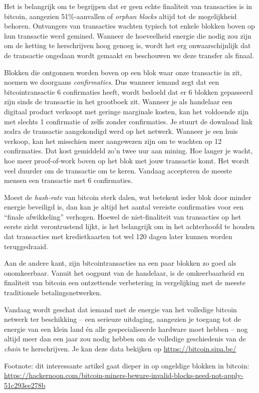 Het is belangrijk om te begrijpen dat er geen echte finaliteit van transacties is in bitcoin, aangezien 51\%-aanvallen of \textit{orphan blocks} altijd tot de mogelijkheid behoren. Ontvangers van transacties wachten typisch tot enkele blokken boven op hun transactie werd gemined. Wanneer de hoeveelheid energie die nodig zou zijn om de ketting te herschrijven hoog genoeg is, wordt het erg onwaarschijnlijk dat de transactie ongedaan wordt gemaakt en beschouwen we deze transfer als finaal.

Blokken die ontgonnen worden boven op een blok waar onze transactie in zit, noemen we doorgaans \textit{confirmaties}. Dus wanneer iemand zegt dat een bitcointransactie 6 confirmaties heeft, wordt bedoeld dat er 6 blokken gepasseerd zijn sinds de transactie in het grootboek zit. Wanneer je als handelaar een digitaal product verkoopt met geringe marginale kosten, kan het voldoende zijn met slechts 1 confirmatie of zelfs zonder confirmaties. Je stuurt de download link zodra de transactie aangekondigd werd op het netwerk. Wanneer je een huis verkoop, kan het misschien meer aangewezen zijn om te wachten op 12 confirmaties. Dat kost gemiddeld zo’n twee uur aan mining. Hoe langer je wacht, hoe meer proof-of-work boven op het blok met jouw transactie komt. Het wordt veel duurder om de transactie om te keren. Vandaag accepteren de meeste mensen een transactie met 6 confirmaties.

Moest de \textit{hash-rate} van bitcoin sterk dalen, wat betekent ieder blok door minder energie beveiligd is, dan kan je altijd het aantal vereiste confirmaties voor een “finale afwikkeling” verhogen. Hoewel de niet-finaliteit van transacties op het eerste zicht verontrustend lijkt, is het belangrijk om in het achterhoofd te houden dat transacties met kredietkaarten tot wel 120 dagen later kunnen worden teruggedraaid.

Aan de andere kant, zijn bitcointransacties na een paar blokken zo goed als onomkeerbaar. Vanuit het oogpunt van de handelaar, is de omkeerbaarheid en finaliteit van bitcoin een ontzettende verbetering in vergelijking met de meeste traditionele betalingsnetwerken.

Vandaag wordt geschat dat iemand met de energie van het volledige bitcoin netwerk ter beschikking -- een serieuze uitdaging, aangezien je toegang tot de energie van een klein land én alle gespecialiseerde hardware moet hebben -- nog altijd meer dan een jaar zou nodig hebben om de volledige geschiedenis van de \textit{chain} te herschrijven. Je kan deze data bekijken op \href{ https://bitcoin.sipa.be/}{https://bitcoin.sipa.be/}

\vfill
Footnote: dit interessante artikel gaat dieper in op ongeldige blokken in bitcoin: \href{ https://hackernoon.com/bitcoin-miners-beware-invalid-blocks-need-not-apply-51c293ee278b }{ https://hackernoon.com/bitcoin-miners-beware-invalid-blocks-need-not-apply-51c293ee278b }
